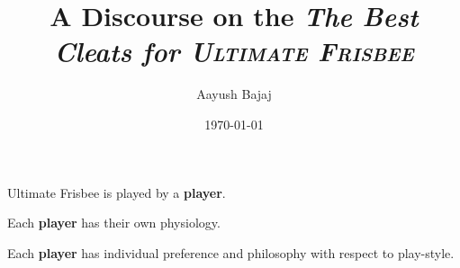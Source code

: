 \documentclass{article}
\title{A Discourse on the \textit{The Best Cleats for \textsc{Ultimate Frisbee}}}
\author{Aayush Bajaj}
\date{\today}
\providecommand\theoremnumber{}
\newenvironment{Axiom}[1]
 {\renewcommand{\theoremnumber}{#1}\begin{Axiombase*}}
 {\end{Axiombase*}}
\begin{document}
\vspace{-2cm}
\maketitle

\dotfill

\thispagestyle{fancy}

\vspace{1cm}

\vspace{0.5cm}

\begin{Axiom}{1}{}
    Ultimate Frisbee is played by a \textbf{player}.
\end{Axiom}

\begin{Axiom}{2}{}
    Each \textbf{player} has their own physiology.
\end{Axiom}

\begin{Axiom}{3}{}
    Each \textbf{player} has individual preference and philosophy with respect to play-style.
\end{Axiom}
\end{document}
